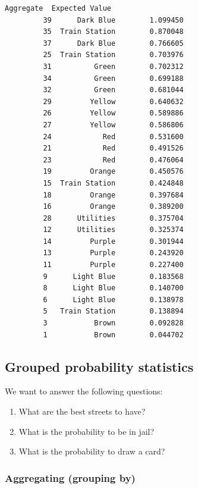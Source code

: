 \documentclass[11pt]{article}
\providecommand{\tightlist}{%
      \setlength{\itemsep}{0pt}\setlength{\parskip}{0pt}}
\begin{document}
\begin{Verbatim}[commandchars=\\\{\}]
                 Aggregate  Expected Value  
         39      Dark Blue        1.099450  
         35  Train Station        0.870048  
         37      Dark Blue        0.766605  
         25  Train Station        0.703976  
         31          Green        0.702312  
         34          Green        0.699188  
         32          Green        0.681044  
         29         Yellow        0.640632  
         26         Yellow        0.589886  
         27         Yellow        0.586806  
         24            Red        0.531600  
         21            Red        0.491526  
         23            Red        0.476064  
         19         Orange        0.450576  
         15  Train Station        0.424848  
         18         Orange        0.397684  
         16         Orange        0.389200  
         28      Utilities        0.375704  
         12      Utilities        0.325374  
         14         Purple        0.301944  
         13         Purple        0.243920  
         11         Purple        0.227400  
         9      Light Blue        0.183568  
         8      Light Blue        0.140700  
         6      Light Blue        0.138978  
         5   Train Station        0.138894  
         3           Brown        0.092828  
         1           Brown        0.044702  
\end{Verbatim}
            
    \hypertarget{grouped-probability-statistics}{%
\subsection{Grouped probability
statistics}\label{grouped-probability-statistics}}

    We want to answer the following questions:

\begin{enumerate}
\def\labelenumi{\arabic{enumi}.}
\tightlist
\item
  What are the best streets to have?
\item
  What is the probability to be in jail?
\item
  What is the probability to draw a card?
\end{enumerate}

    \hypertarget{aggregating-grouping-by}{%
\subsubsection{Aggregating (grouping
by)}\label{aggregating-grouping-by}}
\end{document}
